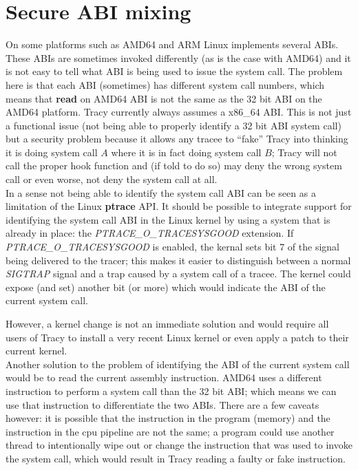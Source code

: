\documentclass[a4paper, 10pt]{report}
\begin{document}
\section{Secure ABI mixing}
\label{secure-abi}

On some platforms such as AMD64 and ARM Linux implements several ABIs.
These ABIs are sometimes invoked differently (as is the case with AMD64)
and it is not easy to tell what ABI is being used to issue the system call.
The problem here is that each ABI (sometimes) has different system call
numbers, which means that \textbf{read} on AMD64 ABI is not the same
as the 32 bit ABI on the AMD64 platform. Tracy currently always assumes
a x86\_64 ABI. This is not just a functional issue (not being able to
properly identify a 32 bit ABI system call) but a security problem because it
allows any tracee to ``fake'' Tracy into thinking it is doing system call $A$
where it is in fact doing system call $B$; Tracy will not call the proper hook
function and (if told to do so) may deny the wrong system call or even worse,
not deny the system call at all. \\

In a sense not being able to identify the system call ABI can be seen as a
limitation of the Linux \textbf{ptrace} API. It should be possible to
integrate support for identifying the system call ABI in the Linux kernel
by using a system that is already in place: the \textit{PTRACE\_O\_TRACESYSGOOD}
extension. If \textit{PTRACE\_O\_TRACESYSGOOD} is enabled, the kernal sets bit 7
of the signal being delivered to the tracer; this makes it easier to distinguish
between a normal \textit{SIGTRAP} signal and a trap caused by a system call of
a tracee. The kernel could expose (and set) another bit (or more) which would
indicate the ABI of the current system call.

However, a kernel change is not an immediate solution and would require all
users of Tracy to install a very recent Linux kernel or even apply a patch
to their current kernel. \\

Another solution to the problem of identifying the ABI of the current
system call would be to read the current assembly instruction. AMD64 uses a
different instruction to perform a system call than the 32 bit ABI; which
means we can use that instruction to differentiate the two ABIs. There are a
few caveats however: it is possible that the instruction in the program (memory)
and the instruction in the cpu pipeline are not the same; a program could use
another thread to intentionally wipe out or change the instruction that was
used to invoke the system call, which would result in Tracy reading a faulty
or fake instruction. \\
\end{document}
